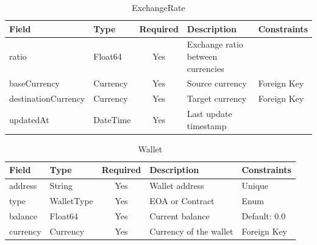 \begin{table}[htbp]
  \centering
  \caption{ExchangeRate}
  \footnotesize
  \renewcommand{\arraystretch}{1.1}
  \setlength{\tabcolsep}{6pt}
  \begin{tabular}{|l|l|c|p{4cm}|p{2.8cm}|}
    \hline
    \textbf{Field} & \textbf{Type} & \textbf{Required} & \textbf{Description} & \textbf{Constraints} \\
    \hline
    ratio & Float64 & Yes & Exchange ratio between currencies & \\
    \hline
    baseCurrency & Currency & Yes & Source currency & Foreign Key \\
    \hline
    destinationCurrency & Currency & Yes & Target currency & Foreign Key \\
    \hline
    updatedAt & DateTime & Yes & Last update timestamp & \\
    \hline
  \end{tabular}
\end{table}

\begin{table}[htbp]
  \centering
  \caption{Wallet}
  \footnotesize
  \renewcommand{\arraystretch}{1.1}
  \setlength{\tabcolsep}{6pt}
  \begin{tabular}{|l|l|c|p{4cm}|p{2.8cm}|}
    \hline
    \textbf{Field} & \textbf{Type} & \textbf{Required} & \textbf{Description} & \textbf{Constraints} \\
    \hline
    address & String & Yes & Wallet address & Unique \\
    \hline
    type & WalletType & Yes & EOA or Contract & Enum \\
    \hline
    balance & Float64 & Yes & Current balance & Default: 0.0 \\
    \hline
    currency & Currency & Yes & Currency of the wallet & Foreign Key \\
    \hline
  \end{tabular}
\end{table}

